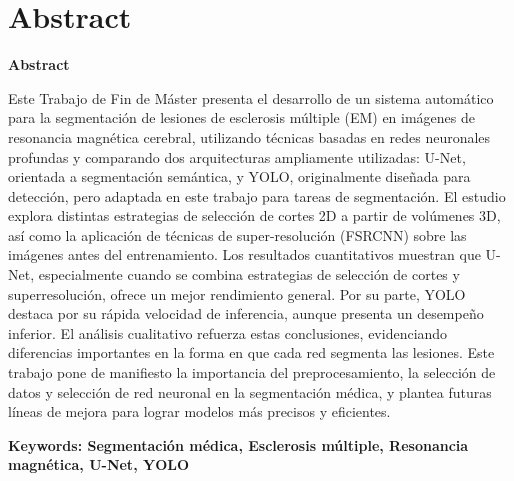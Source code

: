\documentclass[../main.tex]{subfiles}
\begin{document}
\makeatletter
\renewenvironment{abstract}{%
    \if@twocolumn
      \section*{Abstract \\}%
    \else %
    \begin{flushright}
        {\filleft\Huge\bfseries\fontsize{48pt}{12}\selectfont Abstract\vspace{\z@}}%
        \end{flushright}
      \quotation
    \fi}
    {\if@twocolumn\else\endquotation\fi}
\makeatother
\begin{abstract}

Este Trabajo de Fin de Máster presenta el desarrollo de un sistema automático para la segmentación de lesiones de esclerosis múltiple (EM) en imágenes de resonancia magnética cerebral, utilizando técnicas basadas en redes neuronales profundas y comparando dos arquitecturas ampliamente utilizadas: U-Net, orientada a segmentación semántica, y YOLO, originalmente diseñada para detección, pero adaptada en este trabajo para tareas de segmentación. El estudio explora distintas estrategias de selección de cortes 2D a partir de volúmenes 3D, así como la aplicación de técnicas de super-resolución (FSRCNN) sobre las imágenes antes del entrenamiento. Los resultados cuantitativos muestran que U-Net, especialmente cuando se combina estrategias de selección de cortes y superresolución, ofrece un mejor rendimiento general. Por su parte, YOLO destaca por su rápida velocidad de inferencia, aunque presenta un desempeño  inferior. El análisis cualitativo refuerza estas conclusiones, evidenciando diferencias importantes en la forma en que cada red segmenta las lesiones. Este trabajo pone de manifiesto la importancia del preprocesamiento, la selección de datos y selección de red neuronal en la segmentación médica, y plantea futuras líneas de mejora para lograr modelos más precisos y eficientes.

\bfseries{\large{Keywords:}} Segmentación médica, Esclerosis múltiple, Resonancia magnética, U-Net, YOLO

\end{abstract}
\end{document}
